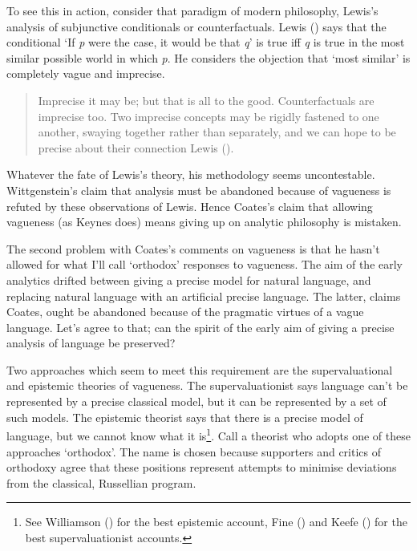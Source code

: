 \documentclass[
  10pt,
  letterpaper,
  DIV=11,
  numbers=noendperiod,
  twoside]{scrartcl}
\begin{document}
To see this in action, consider that paradigm of modern philosophy,
Lewis's analysis of subjunctive conditionals or counterfactuals. Lewis
() says that the conditional `If \emph{p}
were the case, it would be that \emph{q}' is true iff \emph{q} is true
in the most similar possible world in which \emph{p}. He considers the
objection that `most similar' is completely vague and imprecise.

\begin{quote}
Imprecise it may be; but that is all to the good. Counterfactuals are
imprecise too. Two imprecise concepts may be rigidly fastened to one
another, swaying together rather than separately, and we can hope to be
precise about their connection Lewis ().
\end{quote}

Whatever the fate of Lewis's theory, his methodology seems
uncontestable. Wittgenstein's claim that analysis must be abandoned
because of vagueness is refuted by these observations of Lewis. Hence
Coates's claim that allowing vagueness (as Keynes does) means giving up
on analytic philosophy is mistaken.

The second problem with Coates's comments on vagueness is that he hasn't
allowed for what I'll call `orthodox' responses to vagueness. The aim of
the early analytics drifted between giving a precise model for natural
language, and replacing natural language with an artificial precise
language. The latter, claims Coates, ought be abandoned because of the
pragmatic virtues of a vague language. Let's agree to that; can the
spirit of the early aim of giving a precise analysis of language be
preserved?

Two approaches which seem to meet this requirement are the
supervaluational and epistemic theories of vagueness. The
supervaluationist says language can't be represented by a precise
classical model, but it can be represented by a set of such models. The
epistemic theorist says that there is a precise model of language, but
we cannot know what it is\footnote{See Williamson
  () for the best epistemic
  account, Fine () and Keefe
  () for the best supervaluationist
  accounts.}. Call a theorist who adopts one of these approaches
`orthodox'. The name is chosen because supporters and critics of
orthodoxy agree that these positions represent attempts to minimise
deviations from the classical, Russellian program.
\end{document}
